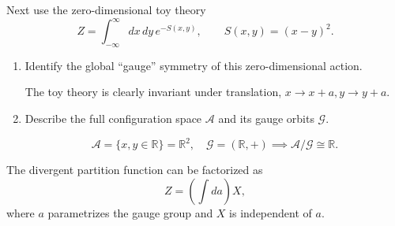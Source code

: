 Next use the zero-dimensional toy theory
\begin{equation}
    Z=\int_{-\infty}^{\infty}dx\,dy\,e^{-S(x,y)},
    \qquad
    S(x,y)=(x-y)^2.
\end{equation}

\begin{enumerate}[label=\alph*),resume]
    \item Identify the global ``gauge'' symmetry of this zero-dimensional action.
    \begin{solution}
        The toy theory is clearly invariant under translation, $x \to x+a, y \to y+a$.
    \end{solution}

    \item Describe the full configuration space $\mathcal{A}$ and its gauge
    orbits $\mathcal{G}$.
    \begin{solution}
        \begin{equation}
            \mathcal{A} = \{x,y\in \mathbb{R}\} = \mathbb{R}^2, \quad \mathcal{G} = (\mathbb{R},+) \implies \mathcal{A}/\mathcal{G} \cong \mathbb{R}.
        \end{equation}
    \end{solution}
\end{enumerate}

The divergent partition function can be factorized as
\begin{equation}
    Z=\left(\int da\right)X,
\end{equation}
where $a$ parametrizes the gauge group and $X$ is independent of $a$.

